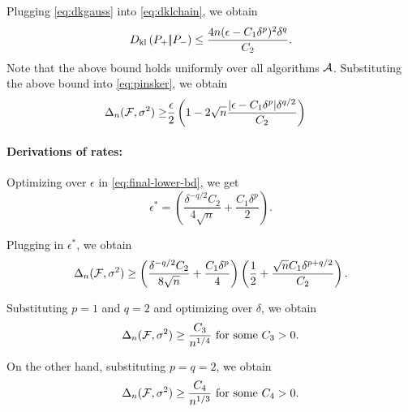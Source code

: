 Plugging \eqref{eq:dkgauss} into \eqref{eq:dklchain}, we obtain
\begin{align}
D_{\rm kl}\left({P_{+}} |\!| {P_{-}} \right) \le \dfrac{4n(\epsilon-C_1\delta^p)^2 \delta^q}{C_2}.\label{eq:dkbd}
\end{align}
Note that the above bound holds uniformly over all algorithms $\mathcal{A}$. 
Substituting the above bound into \eqref{eq:pinsker}, we obtain 
\begin{align}
 \Delta_n(\mathcal{F}, \sigma^2) 
  \ge & \dfrac{\epsilon}{2} \left(1 - 2\sqrt{
    n}  \dfrac{|\epsilon-C_1\delta^p|\delta^{q/2}}{C_2}
  \right)\label{eq:final-lower-bd}
\end{align}

\paragraph{Derivations of rates:}
 Optimizing over $\epsilon$ in \eqref{eq:final-lower-bd}, 
 we get
 $$\epsilon^* = \left(\dfrac{\delta^{-q/2}C_2}{4\sqrt{n}} + \dfrac{C_1\delta^p}{2}\right).$$

 Plugging in $\epsilon^*$, we obtain
 $$\Delta_n(\mathcal{F}, \sigma^2) 
 \ge \left(\dfrac{\delta^{-q/2}C_2}{8\sqrt{n}} + \dfrac{C_1\delta^p}{4}\right) \left( \dfrac{1}{2} + \dfrac{\sqrt{n}C_1 \delta^{p + q/2}}{C_2} \right).$$

Substituting $p=1$ and $q=2$  and optimizing over $\delta$, we obtain
$$\Delta_n(\mathcal{F}, \sigma^2) \ge \dfrac{C_3}{ n^{1/4}} \text{ for some } C_3>0.$$

On the other hand, substituting $p=q=2$, we obtain
$$\Delta_n(\mathcal{F}, \sigma^2) \ge \dfrac{C_4}{ n^{1/3}} \text{ for some } C_4>0.$$
